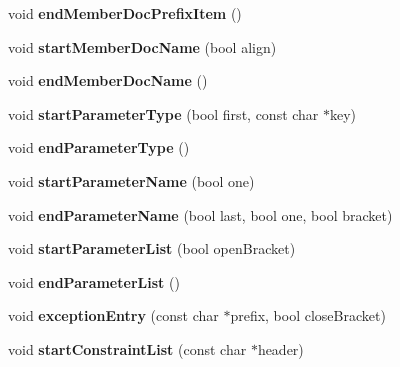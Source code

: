 \begin{DoxyCompactItemize}
\mbox{\label{class_output_list_a7119d284c2d0a7d635d103969d9e628e}} 
void {\bfseries end\+Member\+Doc\+Prefix\+Item} ()
\item 
\mbox{\label{class_output_list_a0b9d56f0ab609c25ba0b449e4d977f80}} 
void {\bfseries start\+Member\+Doc\+Name} (bool align)
\item 
\mbox{\label{class_output_list_a1c30d8717346992a8a9c35f2ae92271f}} 
void {\bfseries end\+Member\+Doc\+Name} ()
\item 
\mbox{\label{class_output_list_ae4db40bcc0a1ca523bff4648727c0c0e}} 
void {\bfseries start\+Parameter\+Type} (bool first, const char $\ast$key)
\item 
\mbox{\label{class_output_list_acb73d83bd4b05b5041de62a7336747e5}} 
void {\bfseries end\+Parameter\+Type} ()
\item 
\mbox{\label{class_output_list_acde2fcc0d42034b7f342d12119957a81}} 
void {\bfseries start\+Parameter\+Name} (bool one)
\item 
\mbox{\label{class_output_list_a099948218dcd590cd91752e318a40c0a}} 
void {\bfseries end\+Parameter\+Name} (bool last, bool one, bool bracket)
\item 
\mbox{\label{class_output_list_a297f991eafa9e368a982c936891bb79e}} 
void {\bfseries start\+Parameter\+List} (bool open\+Bracket)
\item 
\mbox{\label{class_output_list_ab7c1be88384dc59f5ca11f8da2113a4d}} 
void {\bfseries end\+Parameter\+List} ()
\item 
\mbox{\label{class_output_list_ae1a20725b9e3a82aeb7b3024c040a2f9}} 
void {\bfseries exception\+Entry} (const char $\ast$prefix, bool close\+Bracket)
\item 
\mbox{\label{class_output_list_a575e4c75ffabab1820d045ba7e6a15e9}} 
void {\bfseries start\+Constraint\+List} (const char $\ast$header)
\item 

\end{DoxyCompactItemize}
